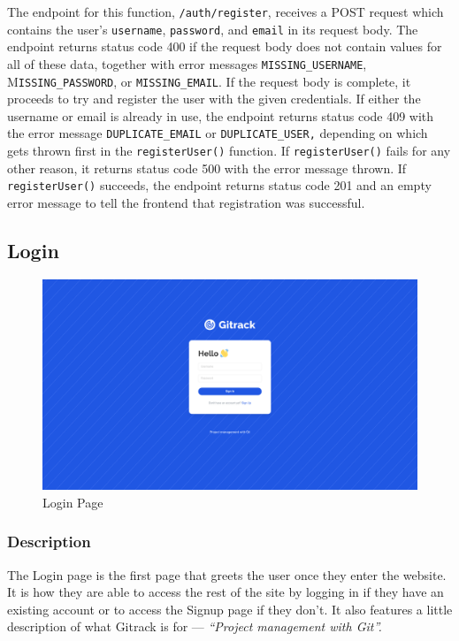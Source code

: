 \documentclass{article}
\def\code#1{\texttt{#1}}
\begin{document}
The endpoint for this function, \code{/auth/register}, receives a POST request
which contains the user’s \code{username}, \code{password}, and \code{email} in
its request body. The endpoint returns status code 400 if the request body does
not contain values for all of these data, together with error messages
\code{MISSING\_USERNAME}, M\code{ISSING\_PASSWORD}, or \code{MISSING\_EMAIL}. If
the request body is complete, it proceeds to try and register the user with the
given credentials. If either the username or email is already in use, the
endpoint returns status code 409 with the error message \code{DUPLICATE\_EMAIL}
or \code{DUPLICATE\_USER,} depending on which gets thrown first in the
\code{registerUser()} function. If \code{registerUser()} fails for any other
reason, it returns status code 500 with the error message thrown. If
\code{registerUser()} succeeds, the endpoint returns status code 201 and an
empty error message to tell the frontend that registration was successful.

\subsection{Login}
\begin{figure}[H]
	\includegraphics[width=1\textwidth]{login}\par\vspace{0.5cm}
	\caption{Login Page}
	\label{fig:login}
\end{figure}
\subsubsection{Description}
The Login page is the first page that greets the user once they enter the
website. It is how they are able to access the rest of the site by logging in if
they have an existing account or to access the Signup page if they don’t. It
also features a little description of what Gitrack is for --- \emph{``Project
management with Git''.}
\end{document}
